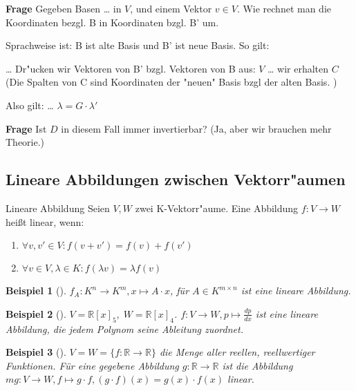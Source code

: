\documentclass[11pt]{article}
\newtheorem{exa}{Beispiel}[section]
\begin{document}
\textbf{Frage} Gegeben Basen \ldots{} in \(V\), und einem Vektor \(v\in V\). Wie rechnet man die
Koordinaten bezgl. B in Koordinaten bzgl. B' um.

Sprachweise ist: B ist alte Basis und B' ist neue Basis.
So gilt:
\begin{relation}
\ldots{} Dr"ucken wir Vektoren von B' bzgl. Vektoren von B aus: \(V\) \ldots{}
wir erhalten \(C\) 
(Die Spalten von C sind Koordinaten der "neuen" Basis bzgl der alten Basis. )

Also gilt: \ldots{}
\(\lambda = G\cdot \lambda'\)
\end{relation}

\textbf{Frage} Ist \(D\) in diesem Fall immer invertierbar? (Ja, aber wir brauchen mehr Theorie.)

\subsection{Lineare Abbildungen zwischen Vektorr"aumen}
\label{sec:orgb4c03c4}
\begin{definition}{Lineare Abbildung}{}
Seien \(V, W\) zwei K-Vektorr"aume. Eine Abbildung \(f: V\rightarrow W\) heißt linear, wenn:

\begin{enumerate}
	\item \(\forall v,v' \in V: f(v+v')=f(v)+f(v')\)
	\item \(\forall v\in V, \lambda \in K: f(\lambda v)=\lambda f(v)\)
\end{enumerate}

\end{definition}

\begin{exa}[] \label{}
$f_{A}: K^n\rightarrow K^m, x\mapsto A\cdot x$, für $A \in K^{m\times n}$ ist eine lineare Abbildung.
\end{exa}

\begin{exa}[] \label{}
\(V=\mathbb{R}[x]_5,\;W=\mathbb{R}[x]_4\). $f: V\rightarrow W, p \mapsto \frac{dp}{dx}$ ist eine lineare Abbildung, die jedem Polynom seine Ableitung zuordnet.
\end{exa}

\begin{exa}[] \label{}
$V=W=\{f:\mathbb{R}\rightarrow\mathbb{R}\}$ die Menge aller reellen, reellwertiger Funktionen. Für eine gegebene Abbildung $g:\mathbb{R}\rightarrow\mathbb{R}$ ist die Abbildung $mg: V\rightarrow W, f\mapsto g\cdot f, (g\cdot f)(x)=g(x)\cdot f(x)$ linear.
\end{exa}
\end{document}

